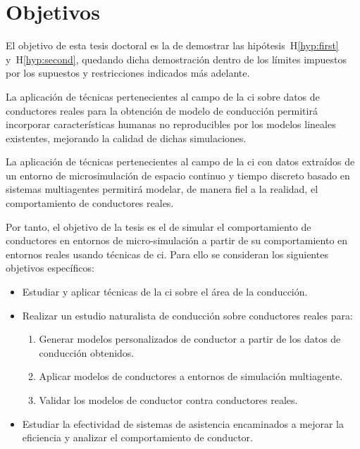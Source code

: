 \section{Objetivos}
\label{ch:intro:objectives}

El objetivo de esta tesis doctoral es la de demostrar las hipótesis~H\ref{hyp:first} y~H\ref{hyp:second}, quedando dicha demostración dentro de los límites impuestos por los supuestos y restricciones indicados más adelante.

\begin{hyp} \label{hyp:first}
	La aplicación de técnicas pertenecientes al campo de la \ac{ci} sobre datos de conductores reales para la obtención de modelo de conducción permitirá incorporar características humanas no reproducibles por los modelos lineales existentes, mejorando la calidad de dichas simulaciones.
\end{hyp}

\begin{hyp} \label{hyp:second}
	La aplicación de técnicas pertenecientes al campo de la \ac{ci} con datos extraídos de un entorno de microsimulación de espacio continuo y tiempo discreto basado en sistemas multiagentes permitirá modelar, de manera fiel a la realidad, el comportamiento de conductores reales.
\end{hyp}

Por tanto, el objetivo de la tesis es el de simular el comportamiento de conductores en entornos de micro-simulación a partir de su comportamiento en entornos reales usando técnicas de \ac{ci}. Para ello se consideran los siguientes objetivos específicos:

\begin{itemize}
	\item Estudiar y aplicar técnicas de la \ac{ci} sobre el área de la conducción.
	\item Realizar un estudio naturalista de conducción sobre conductores reales para:
	\begin{enumerate}
		\item Generar modelos personalizados de conductor a partir de los datos de conducción obtenidos.
		\item Aplicar modelos de conductores a entornos de simulación multiagente.
		\item Validar los modelos de conductor contra conductores reales.
	\end{enumerate}
	\item Estudiar la efectividad de sistemas de asistencia encaminados a mejorar la eficiencia y analizar el comportamiento de conductor.
\end{itemize}

